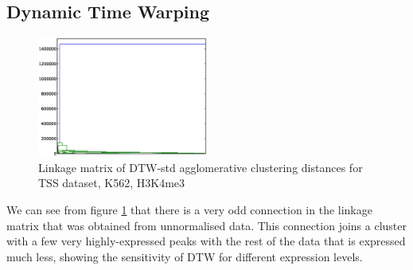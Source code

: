 \documentclass[10pt,a4paper]{article}
\begin{document}
\subsection{Dynamic Time Warping}

\begin{figure}
\centering
\includegraphics[width=0.5\textwidth]{images/linkage-dtw-std-unnormalised-k562-resolution25.eps}
\caption{Linkage matrix of DTW-std agglomerative clustering distances for TSS dataset, K562, H3K4me3}
\label{fig:linkage-k562-h3k4me3-unnormalised}
\end{figure}

We can see from figure \ref{fig:linkage-k562-h3k4me3-unnormalised} that there is a very odd connection in the linkage matrix that was obtained from unnormalised data.
This connection joins a cluster with a few very highly-expressed peaks with the rest of the data that is expressed much less, showing the sensitivity of DTW for different expression levels.
\end{document}
